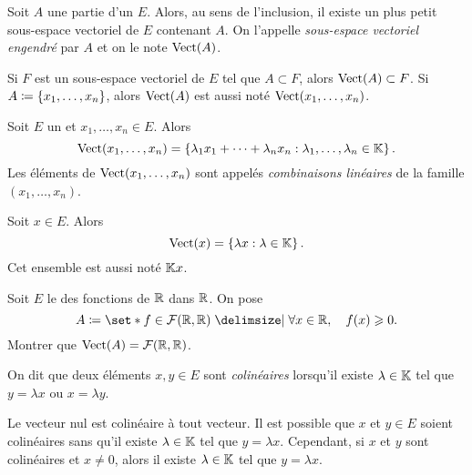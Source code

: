 \documentclass{magnolia}
\begin{document}
\begin{definition}[utile=-2]
Soit $A$ une partie d'un \Kev $E$. Alors, au sens de l'inclusion, il existe un plus petit
sous-espace vectoriel de $E$ contenant $A$. On l'appelle \emph{sous-espace vectoriel
engendré} par $A$ et on le note $\operatorname{Vect}(A)$.
\end{definition}

\begin{remarques}
\remarque Si $F$ est un sous-espace vectoriel de $E$ tel que $A\subset F$, alors
  $\operatorname{Vect}(A)\subset F$.
\remarque Si $A\coloneqq\left\{x_1,\ldots,x_n\right\}$, alors $\operatorname{Vect}(A)$ est aussi noté
  $\operatorname{Vect}(x_1,\ldots,x_n)$.
\end{remarques}

\begin{proposition}[utile=-2]
Soit $E$ un \Kev et $x_1,\ldots,x_n\in E$. Alors
\[\vect(x_1,\ldots,x_n)=\ensim{\lambda_1 x_1+\cdots+\lambda_n x_n}%
  {\lambda_1,\ldots,\lambda_n\in\K}.\]
Les éléments de $\operatorname{Vect}(x_1,\ldots,x_n)$ sont appelés \emph{combinaisons linéaires}
de la famille $(x_1,\ldots,x_n)$.
\end{proposition}

\begin{remarqueUnique}
\remarque Soit $x\in E$. Alors
  \[\operatorname{Vect}(x)=\left\{\lambda x : \lambda\in\mathbb{K}\right\}.\]
  Cet ensemble est aussi noté $\mathbb{K} x$.
\end{remarqueUnique}

\begin{exoUnique}
\exo Soit $E$ le \Rev des fonctions de $\mathbb{R}$ dans $\mathbb{R}$. On pose
  \[A\defeq\enstq{f\in\mathcal{F}(\R,\R)}{\forall x\in\R \qsep f(x)\geq 0}.\]
	Montrer que $\operatorname{Vect}(A)=\mathcal{F}(\mathbb{R},\mathbb{R})$.
\end{exoUnique}

\begin{definition}
  On dit que deux éléments $x,y\in E$ sont \emph{colinéaires} lorsqu'il existe
  $\lambda\in\mathbb{K}$ tel que $y=\lambda x$ ou $x=\lambda y$.
\end{definition}

\begin{remarques}
\remarque Le vecteur nul est colinéaire à tout vecteur.
\remarque Il est possible que
  $x$ et $y\in E$ soient colinéaires sans qu'il existe $\lambda\in\mathbb{K}$ tel que $y=\lambda x$.
  Cependant, si $x$ et $y$ sont colinéaires et $x\neq 0$, alors il existe $\lambda\in\mathbb{K}$
  tel que $y=\lambda x$.
\end{remarques}
\end{document}
